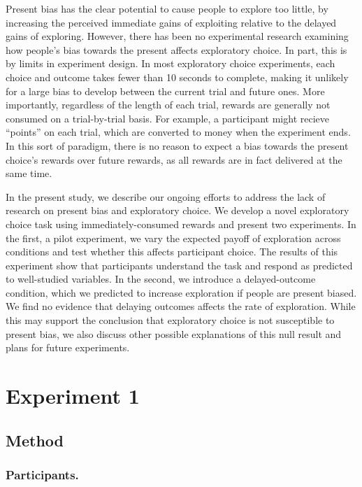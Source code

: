 \documentclass[10pt,letterpaper]{article}
\begin{document}
Present bias has the clear potential to cause people to explore too little, by
increasing the perceived immediate gains of exploiting relative to the delayed
gains of exploring. However, there has been no experimental research
examining how people's bias towards the present affects exploratory choice. In
part, this is by limits in experiment design. In most exploratory
choice experiments, each choice and outcome takes fewer than 10 seconds to
complete, making it unlikely for a large bias to develop between the current
trial and future ones. More importantly, regardless of the length of each trial,
rewards are generally not consumed on a trial-by-trial basis. For example, a participant
might recieve ``points'' on each trial, which are converted to money when the
experiment ends. In this sort of paradigm, there is no reason to expect a bias
towards the present choice's rewards over future rewards, as all rewards are
in fact delivered at the same time.

In the present study, we describe our ongoing efforts to address the lack of research on present bias
and exploratory choice. We develop a novel exploratory choice task using
immediately-consumed rewards and present two experiments. In the first, a pilot
experiment, we vary
the expected payoff of exploration across conditions and test whether this affects
participant choice. The results of this experiment show that participants understand the task and respond
as predicted to well-studied variables. In the second, we introduce a
delayed-outcome condition, which we predicted to increase exploration
if people are present biased. We find no evidence that delaying outcomes affects
the rate of exploration. While this may support the conclusion that exploratory
choice is not susceptible to present bias, we also discuss other possible
explanations of this null result and plans for future experiments.

\section{Experiment 1}

\subsection{Method}

\subsubsection{Participants.}
\end{document}
